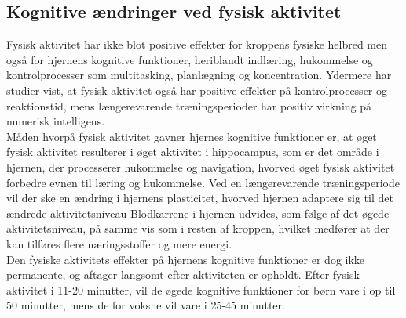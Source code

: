 \subsection{Kognitive ændringer ved fysisk aktivitet}

Fysisk aktivitet har ikke blot positive effekter for kroppens fysiske helbred men også for hjernens kognitive funktioner, heriblandt indlæring, hukommelse og kontrolprocesser som multitasking, planlægning og koncentration\citep{Berchtold2010,Schmidt2015}. Ydermere har studier vist, at fysisk aktivitet også har positive effekter på kontrolprocesser og reaktionstid, mens længerevarende træningsperioder har positiv virkning på numerisk intelligens\citep{Bugge2015,Berchtold2010,Schmidt2015}.\\
Måden hvorpå fysisk aktivitet gavner hjernes kognitive funktioner er, at øget fysisk aktivitet resulterer i øget aktivitet i hippocampus, som er det område i hjernen, der processerer hukommelse og navigation, hvorved øget fysisk aktivitet forbedre evnen til læring og hukommelse. Ved en længerevarende træningsperiode vil der ske en ændring i hjernens plasticitet, hvorved hjernen adaptere sig til det ændrede aktivitetsniveau Blodkarrene i hjernen udvides, som følge af det øgede aktivitetsniveau, på samme vis som i resten af kroppen, hvilket medfører at der kan tilføres flere næringsstoffer og mere energi.\citep{Cotman2007}\\
Den fysiske aktivitets effekter på hjernens kognitive funktioner er dog ikke permanente, og aftager langsomt efter aktiviteten er opholdt. Efter fysisk aktivitet i 11-20 minutter, vil de øgede kognitive funktioner for børn vare i op til 50 minutter, mens de for voksne vil vare i 25-45 minutter.\citep{Cotman2007}



